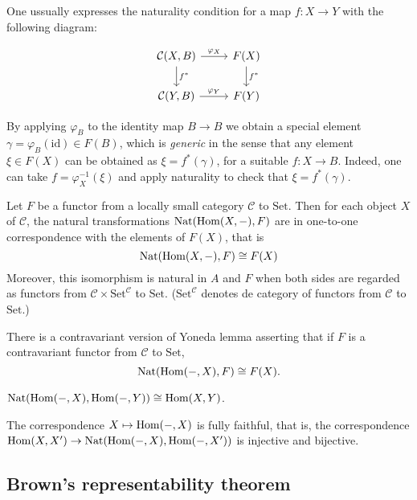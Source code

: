 \begin{definition}
\begin{definition}
	One ussually expresses the naturality condition for a map $f:X\to Y$ with the following diagram:

	$$\begin{tikzcd}
		\mathcal{C}(X,B)\arrow[r,"\varphi_{X}"]\arrow[d,"f^{*}"]&F(X)\arrow[d,"f^{*}"]\\
		\mathcal{C}(Y,B)\arrow[r,"\varphi_{Y}"]&F(Y)
	\end{tikzcd}$$
\end{definition}

\begin{remark}
	By applying $\varphi_{B}$ to the identity map  $B\to B$ we obtain a special element $\gamma=\varphi_{B}(\text{id})\in F(B)$, which is \textit{generic} in the sense that any element $\xi \in F(X)$ can be obtained as $\xi=f^{*} (\gamma)$, for a suitable $f:X\to B$. Indeed, one can take $f=\varphi^{-1}_{X}(\xi)$ and apply naturality to check that $\xi=f^{*}(\gamma)$. 
\end{remark}


\begin{lemma}
	Let $F$ be a functor from a locally small category $\mathcal{C}$ to $\text{Set}$. Then for each object $X$ of $\mathcal{C}$, the natural transformations $\text{Nat}(\mathop{\mathrm{Hom}}\nolimits(X,-),F)$ are in one-to-one correspondence with the elements of $F(X)$, that is
	$$\text{Nat}(\mathop{\mathrm{Hom}}\nolimits(X,-), F)\cong F(X)$$
Moreover, this isomorphism is natural in $A$ and $F$ when both sides are regarded as functors from $\mathcal{C}\times\text{Set}^{\mathcal{C}}$ to $\text{Set}$. ($\text{Set}^{\mathcal{C}}$ denotes de category of functors from $\mathcal{C}$ to $\text{Set}$.)
	
	There is a contravariant version of Yoneda lemma asserting that if $F$ is a contravariant functor from $\mathcal{C}$ to $\text{Set}$,
	$$\text{Nat}(\mathop{\mathrm{Hom}}\nolimits(-,X), F)\cong F(X).$$
\end{lemma}
\begin{lemma}
	$\text{Nat} (\mathop{\mathrm{Hom}}\nolimits(-,X),\mathop{\mathrm{Hom}}\nolimits(-,Y))\cong\text{Hom}(X,Y)$.
\end{lemma}
\begin{remark}
	The correspondence $X\mapsto\mathop{\mathrm{Hom}}\nolimits(-,X)$ is fully faithful, that is, the correspondence $\mathop{\mathrm{Hom}}\nolimits(X,X')\to\text{Nat}(\text{Hom}(-,X),\text{Hom}(-,X'))$ is injective and bijective.
\end{remark}

\subsection{Brown's representability theorem}


\end{definition}
